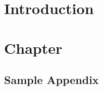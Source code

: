\documentclass[a4paper, 11pt]{report}
\begin{document}

\chapter{Introduction}
\label{chap:introduction}



\chapter{Chapter}
\label{chap:conclusions}




\titleformat{\chapter}[display]	%
{\normalfont\huge\bfseries}{\chaptertitlename\ \thechapter}{20pt}{\Huge}
\begin{appendix}			%
\chapter{Sample Appendix}	%
\label{app: sample appendix}

%
%
\end{appendix}
\end{document}
